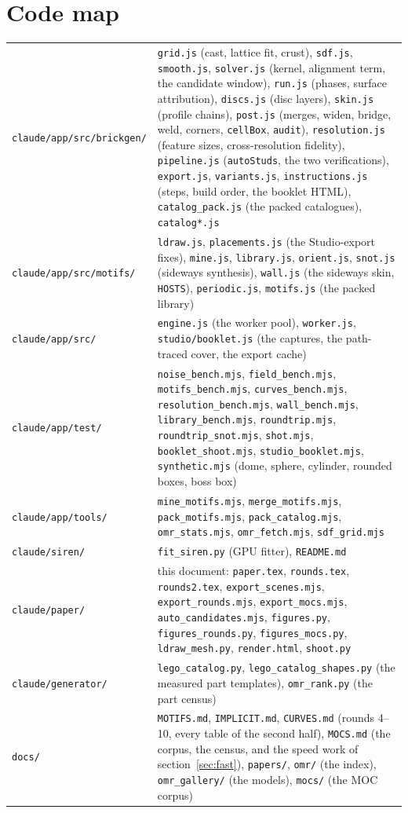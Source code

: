 \documentclass[10pt,a4paper]{article}
\newcommand{\code}[1]{\texttt{\small #1}}
\begin{document}
\section*{Code map}
\small
\begin{tabular}{p{3.6cm}p{13.2cm}}
\code{claude/app/src/brickgen/} & \code{grid.js} (cast, lattice fit, crust), \code{sdf.js}, \code{smooth.js}, \code{solver.js} (kernel, alignment term, the candidate window), \code{run.js} (phases, surface attribution), \code{discs.js} (disc layers), \code{skin.js} (profile chains), \code{post.js} (merges, widen, bridge, weld, corners, \code{cellBox}, \code{audit}), \code{resolution.js} (feature sizes, cross-resolution fidelity), \code{pipeline.js} (\code{autoStuds}, the two verifications), \code{export.js}, \code{variants.js}, \code{instructions.js} (steps, build order, the booklet HTML), \code{catalog\_pack.js} (the packed catalogues), \code{catalog*.js} \\
\code{claude/app/src/motifs/} & \code{ldraw.js}, \code{placements.js} (the Studio-export fixes), \code{mine.js}, \code{library.js}, \code{orient.js}, \code{snot.js} (sideways synthesis), \code{wall.js} (the sideways skin, \code{HOSTS}), \code{periodic.js}, \code{motifs.js} (the packed library) \\
\code{claude/app/src/} & \code{engine.js} (the worker pool), \code{worker.js}, \code{studio/booklet.js} (the captures, the path-traced cover, the export cache) \\
\code{claude/app/test/} & \code{noise\_bench.mjs}, \code{field\_bench.mjs}, \code{motifs\_bench.mjs}, \code{curves\_bench.mjs}, \code{resolution\_bench.mjs}, \code{wall\_bench.mjs}, \code{library\_bench.mjs}, \code{roundtrip.mjs}, \code{roundtrip\_snot.mjs}, \code{shot.mjs}, \code{booklet\_shoot.mjs}, \code{studio\_booklet.mjs}, \code{synthetic.mjs} (dome, sphere, cylinder, rounded boxes, boss box) \\
\code{claude/app/tools/} & \code{mine\_motifs.mjs}, \code{merge\_motifs.mjs}, \code{pack\_motifs.mjs}, \code{pack\_catalog.mjs}, \code{omr\_stats.mjs}, \code{omr\_fetch.mjs}, \code{sdf\_grid.mjs} \\
\code{claude/siren/} & \code{fit\_siren.py} (GPU fitter), \code{README.md} \\
\code{claude/paper/} & this document: \code{paper.tex}, \code{rounds.tex}, \code{rounds2.tex}, \code{export\_scenes.mjs}, \code{export\_rounds.mjs}, \code{export\_mocs.mjs}, \code{auto\_candidates.mjs}, \code{figures.py}, \code{figures\_rounds.py}, \code{figures\_mocs.py}, \code{ldraw\_mesh.py}, \code{render.html}, \code{shoot.py} \\
\code{claude/generator/} & \code{lego\_catalog.py}, \code{lego\_catalog\_shapes.py} (the measured part templates), \code{omr\_rank.py} (the part census) \\
\code{docs/} & \code{MOTIFS.md}, \code{IMPLICIT.md}, \code{CURVES.md} (rounds 4--10, every table of the second half), \code{MOCS.md} (the corpus, the census, and the speed work of section~\ref{sec:fast}), \code{papers/}, \code{omr/} (the index), \code{omr\_gallery/} (the models), \code{mocs/} (the MOC corpus) \\
\end{tabular}
\end{document}
